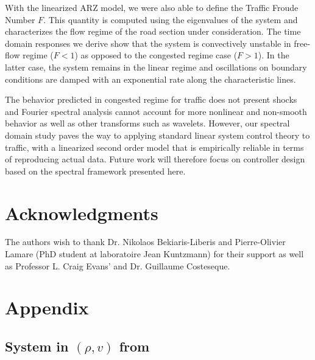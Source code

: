 \documentclass[a4paper, 10pt, conference]{ieeeconf}      %
\begin{document}
With the linearized ARZ model, we were also able to define the Traffic Froude Number $F$. This quantity is computed using the eigenvalues of the system and characterizes the flow regime of the road section under consideration. The time domain responses we derive show that the system is convectively unstable in free-flow regime ($F < 1$) as opposed to the congested regime case ($F>1$). In the latter case, the system remains in the linear regime and oscillations on boundary conditions are damped with an exponential rate along the characteristic lines.

The behavior predicted in congested regime for traffic does not present shocks and Fourier spectral analysis cannot account for more nonlinear and non-smooth behavior as well as other transforms such as wavelets. However, our spectral domain study paves the way to applying standard linear system control theory to traffic, with a linearized second order model that is empirically reliable in terms of reproducing actual data. Future work will therefore focus on controller design based on the spectral framework presented here.

\section*{Acknowledgments}
The authors wish to thank Dr. Nikolaos Bekiaris-Liberis and Pierre-Olivier Lamare (PhD student at laboratoire Jean Kuntzmann) for their support as well as Professor L. Craig Evans' and Dr. Guillaume Costeseque.




\newpage
\section*{Appendix}

\subsection{System in $(\rho, v)$ from}
\end{document}
